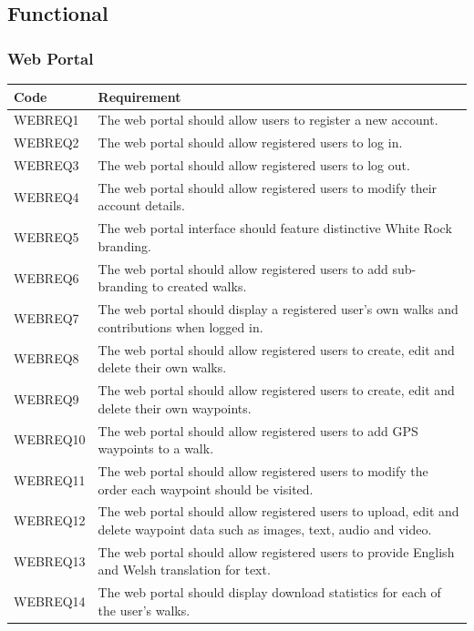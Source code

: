 \documentclass[11pt,a4paper]{article}
\begin{document}
\subsection{Functional}
\label{sec:func-reqs}
\subsubsection{Web Portal}
\label{sec:req-reg-login}

\begin{longtable}{|p{2.5cm}p{13cm}|}
\hline
\textbf{Code} & \textbf{Requirement} \\
\hline
WEBREQ1 & The web portal should allow users to register a new account. \\ \hline
WEBREQ2 & The web portal should allow registered users to log in. \\ \hline
WEBREQ3 & The web portal should allow registered users to log out. \\ \hline
WEBREQ4 & The web portal should allow registered users to modify their account details. \\ \hline
WEBREQ5 & The web portal interface should feature distinctive White Rock branding. \\ \hline
WEBREQ6 & The web portal should allow registered users to add sub-branding to created walks. \\ \hline
WEBREQ7 & The web portal should display a registered user's own walks and contributions when logged in. \\ \hline
WEBREQ8 & The web portal should allow registered users to create, edit and delete their own walks. \\ \hline
WEBREQ9 & The web portal should allow registered users to create, edit and delete their own waypoints. \\ \hline
WEBREQ10 & The web portal should allow registered users to add GPS waypoints to a walk. \\ \hline
WEBREQ11 & The web portal should allow registered users to modify the order each waypoint should be visited. \\ \hline
WEBREQ12 & The web portal should allow registered users to upload, edit and delete waypoint data such as images, text, audio and video. \\ \hline
WEBREQ13 & The web portal should allow registered users to provide English and Welsh translation for text. \\ \hline
WEBREQ14 & The web portal should display download statistics for each of the user's walks. \\ \hline

\end{longtable}
\end{document}
